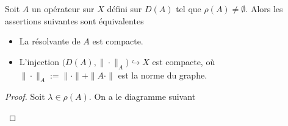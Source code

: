 \begin{proposition}\label{prop_injec_compacte}
    Soit $A$ un opérateur sur $X$ défini sur $D(A)$ tel que $\rho(A) \neq \emptyset$. Alors les assertions suivantes sont équivalentes
    \begin{itemize}
        \item[$(i)$] La résolvante de $A$ est compacte.
        \item[$(ii)$] L'injection $\big(D(A),\|\cdot\|_A\big) \hookrightarrow X$ est compacte, où $\|\cdot\|_A:=\|\cdot\| + \|A\cdot\|$ est la norme du graphe.
    \end{itemize}
\end{proposition}

\begin{proof}
    Soit $\lambda \in \rho(A)$. On a le diagramme suivant 
    \begin{center}
\end{center}
\end{proof}
